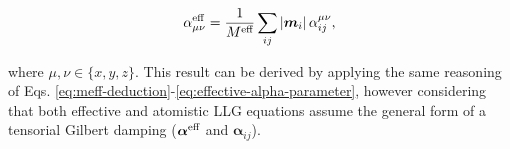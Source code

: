 \begin{equation}
\label{eq:effective-tensor-elements}
\alpha^{\textnormal{eff}}_{\mu\nu} = \frac{1}{M^{\textnormal{eff}}}\sum_{ij} \left|\vec{m}_i \right|\alpha_{ij}^{\mu\nu},
\end{equation}


\noindent where $\mu,\nu\in\{x,y,z\}$. This result can be derived by applying the same reasoning of Eqs. \ref{eq:meff-deduction}-\ref{eq:effective-alpha-parameter}, however considering that both effective and atomistic LLG equations assume the general form of a tensorial Gilbert damping ($\boldsymbol{\alpha}^{\textnormal{eff}}$ and $\boldsymbol{\alpha}_{ij}$).






